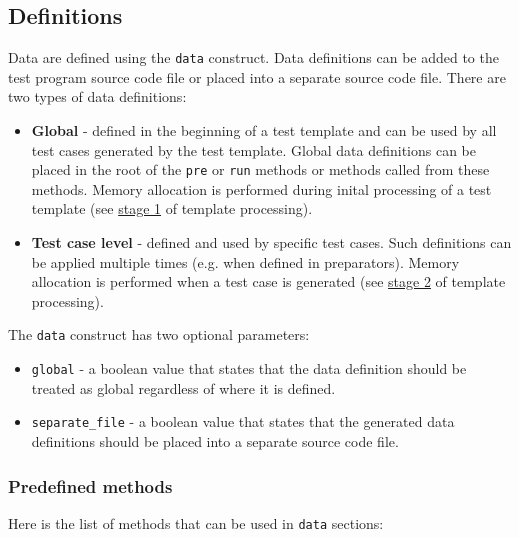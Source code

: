 \documentclass[oneside,final,12pt]{extreport}
\begin{document}
\subsection{Definitions}

Data are defined using the \texttt{data} construct. Data definitions can be added to the test
program source code file or placed into a separate source code file. There are two types of
data definitions:

\begin{itemize}
\item \textbf{Global} - defined in the beginning of a test template and can be used by
      all test cases generated by the test template. Global data definitions can be placed in
      the root of the \texttt{pre} or \texttt{run} methods or methods called from these methods.
      Memory allocation is performed during inital processing of a test template (see
      \hyperref[ttp_stage_1]{stage 1} of template processing).

\item \textbf{Test case level} - defined and used by specific test cases. Such definitions
      can be applied multiple times (e.g. when defined in preparators).
      Memory allocation is performed when a test case is generated (see
      \hyperref[ttp_stage_2]{stage 2} of template processing).
\end{itemize}

The \texttt{data} construct has two optional parameters:

\begin{itemize}
\item \texttt{global} - a boolean value that states that the data definition should be
      treated as global regardless of where it is defined.
\item \texttt{separate{\_}file} - a boolean value that states that the generated data
      definitions should be placed into a separate source code file.
\end{itemize}

\subsubsection{Predefined methods}

Here is the list of methods that can be used in \texttt{data} sections:
\end{document}

